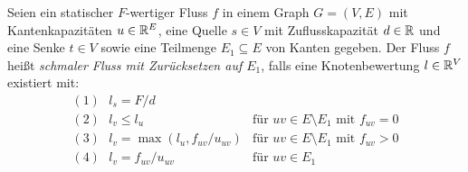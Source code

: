 \begin{definition}
	Seien ein statischer $F$-wertiger Fluss $f$ in einem Graph $G=(V,E)$ mit Kantenkapazitäten $u\in\mathbb{R}^E$, eine Quelle $s\in V$ mit Zuflusskapazität $d\in\mathbb{R}$ und eine Senke $t\in V$ sowie eine Teilmenge $E_1\subseteq E$ von Kanten gegeben.
	Der Fluss $f$ heißt \emph{schmaler Fluss mit Zurücksetzen auf $E_1$}, falls eine Knotenbewertung $l\in\mathbb{R}^V$ existiert mit:
	$$\begin{array}{ll}
	(1)~~~	l_s = F/d& \\
	(2)~~~	l_v \leq l_u &\text{für $uv\in E \setminus E_1$ mit $f_{uv}=0$}\\
	(3)~~~	l_v = \max(l_u, f_{uv} / u_{uv} ) &\text{für $uv\in E\setminus E_1$ mit $f_{uv} > 0$}\\
	(4)~~~	l_v = f_{uv} / u_{uv} & \text{für $uv\in E_1$}
	\end{array}$$
\end{definition}

